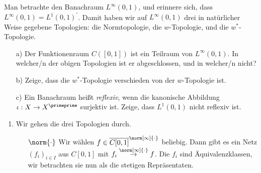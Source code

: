 \begin{exercise}
Man betrachte den Banachraum $L^{\infty}(0,1)$, und erinnere sich, dass
$L^{\infty}(0,1) = L^1(0,1)^{\prime}$. Damit haben wir auf $L^{\infty}(0,1)$ drei
in natürlicher Weise gegebene Topologien: die Normtopologie, die $w$-Topologie,
und die $w^*$-Topologie.
\begin{itemize}
  \item [a)] Der Funktionenraum $C([0,1])$ ist ein Teilraum von $L^{\infty}(0,1)$.
  In welcher/n der obigen Topologien ist er abgeschlossen, und in welcher/n nicht?
  \item [b)] Zeige, dass die $w^*$-Topologie verschieden von der $w$-Topologie ist.
  \item [c)] Ein Banachraum heißt \textit{reflexiv}, wenn die kanonische Abbildung
  $\iota: X \rightarrow X^{\primeprime}$ surjektiv ist. Zeige, dass $L^1(0,1)$ nicht
  reflexiv ist.
\end{itemize}

\end{exercise}

\begin{solution}
  \phantom{}
  \begin{enumerate}[label = (\alph*)]
    \item Wir gehen die drei Topologien durch.
    \begin{enumerate}
      \item[\glqq $\norm{\cdot}$ \grqq] Wir wählen $f \in \overline{C[0, 1]}^{\norm[\infty]{\cdot}}$ beliebig. Dann gibt es ein Netz $(f_i)_{i \in I}$ aus $C[0,1]$ mit $f_i \stackrel{\norm[\infty]{\cdot}}{\to} f$. Die $f_i$ sind Äquivalenzklassen, wir betrachten sie nun als die stetigen Repräsentaten.
    \end{enumerate}
  \end{enumerate}
\end{solution}

